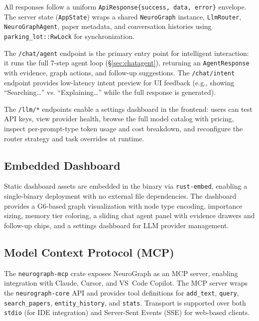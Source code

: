 \documentclass[11pt,a4paper,twocolumn]{article}
\begin{document}
All responses follow a uniform \texttt{ApiResponse\{success, data,
error\}} envelope. The server state (\texttt{AppState}) wraps a
shared \texttt{NeuroGraph} instance, \texttt{LlmRouter},
\texttt{NeuroGraphAgent}, paper metadata, and conversation
histories using \texttt{parking\_lot::RwLock} for synchronization.

The \texttt{/chat/agent} endpoint is the primary entry point for
intelligent interaction: it runs the full 7-step agent loop
(\S\ref{sec:chatagent}), returning an \texttt{AgentResponse} with
evidence, graph actions, and follow-up suggestions. The
\texttt{/chat/intent} endpoint provides low-latency intent preview
for UI feedback (e.g., showing ``Searching\ldots'' vs.
``Explaining\ldots'' while the full response is generated).

The \texttt{/llm/*} endpoints enable a settings dashboard in the
frontend: users can test API keys, view provider health, browse
the full model catalog with pricing, inspect per-prompt-type token
usage and cost breakdown, and reconfigure the router strategy
and task overrides at runtime.

\subsection{Embedded Dashboard}

Static dashboard assets are embedded in the binary via
\texttt{rust-embed}, enabling a single-binary deployment with no
external file dependencies. The dashboard provides a G6-based
graph visualization with node type encoding, importance sizing,
memory tier coloring, a sliding chat agent panel with evidence
drawers and follow-up chips, and a settings dashboard for
LLM provider management.

\subsection{Model Context Protocol (MCP)}
\label{sec:mcp}

The \texttt{neurograph-mcp} crate exposes NeuroGraph as an MCP
server, enabling integration with Claude, Cursor, and VS~Code
Copilot. The MCP server wraps the \texttt{neurograph-core} API
and provides tool definitions for \texttt{add\_text},
\texttt{query}, \texttt{search\_papers}, \texttt{entity\_history},
and \texttt{stats}. Transport is supported over both \texttt{stdio}
(for IDE integration) and Server-Sent Events (SSE) for web-based
clients.

\end{document}
